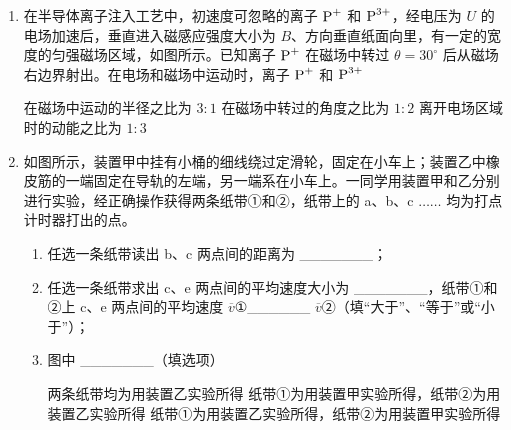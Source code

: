 \documentclass[\gkver]{gaokaozhenti}
\begin{document}
\begin{enumerate}

\item
在半导体离子注入工艺中，初速度可忽略的离子 $\ce{P+}$ 和 $\ce{P^{3+}}$，经电压为 $U$ 的电场加速后，垂直进入磁感应强度大小为 $B$、方向垂直纸面向里，有一定的宽度的匀强磁场区域，如图所示。已知离子 $\ce{P+}$ 在磁场中转过 $\theta=30^{\circ}$ 后从磁场右边界射出。在电场和磁场中运动时，离子 $\ce{P+}$ 和 $\ce{P^{3+}}$


{在磁场中运动的半径之比为 $3:1$}
{在磁场中转过的角度之比为 $1:2$}
{离开电场区域时的动能之比为 $1:3$}


\item
如图所示，装置甲中挂有小桶的细线绕过定滑轮，固定在小车上；装置乙中橡皮筋的一端固定在导轨的左端，另一端系在小车上。一同学用装置甲和乙分别进行实验，经正确操作获得两条纸带①和②，纸带上的 a、b、c $\ldots\ldots$ 均为打点计时器打出的点。
\begin{enumerate}
	\item
	任选一条纸带读出 b、c 两点间的距离为 \_\_\_\_\_\_\_；
	\item
	任选一条纸带求出 c、e 两点间的平均速度大小为 \_\_\_\_\_\_\_，纸带①和②上 c、e 两点间的平均速度 $\overline{v}$①\_\_\_\_\_\_ $\overline{v}$②（填“大于”、“等于”或“小于”）；
	\item
	图中 \_\_\_\_\_\_\_（填选项）

	{两条纸带均为用装置乙实验所得}
	{纸带①为用装置甲实验所得，纸带②为用装置乙实验所得}
	{纸带①为用装置乙实验所得，纸带②为用装置甲实验所得}
\end{enumerate}


\end{enumerate}
\end{document}

